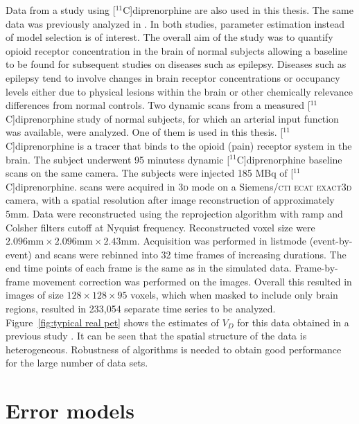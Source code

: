 Data from a \pet study using [$^{11}$C]diprenorphine are also used in this
thesis. The same data was previously analyzed in
\cite{Peng:2008fx,Jiang:2009kf}. In both studies, parameter estimation
instead of model selection is of interest. The overall aim of the study was
to quantify opioid receptor concentration in the brain of normal subjects
allowing a baseline to be found for subsequent studies on diseases such as
epilepsy. Diseases such as epilepsy tend to involve changes in brain receptor
concentrations or occupancy levels either due to physical lesions within the
brain or other chemically relevance differences from normal controls. Two
dynamic scans from a measured [$^{11}$C]diprenorphine study of normal
subjects, for which an arterial input function was available, were analyzed.
One of them is used in this thesis. [$^{11}$C]diprenorphine is a tracer that
binds to the opioid (pain) receptor system in the brain. The subject
underwent 95 minutess dynamic [$^{11}$C]diprenorphine \pet baseline scans on
the same camera. The subjects were injected 185 MBq of
[$^{11}$C]diprenorphine. \pet scans were acquired in \textsc{3d} mode on a
Siemens/\textsc{cti ecat exact3d} \pet camera, with a spatial resolution
after image reconstruction of approximately $5\text{mm}$. Data were
reconstructed using the reprojection algorithm \citep{Kinahan1989} with ramp
and Colsher filters cutoff at Nyquist frequency. Reconstructed voxel size
were $2.096 \text{mm} \times 2.096 \text{mm} \times2.43 \text{mm}$.
Acquisition was performed in listmode (event-by-event) and scans were
rebinned into 32 time frames of increasing durations. The end time points of
each frame is the same as in the simulated data. Frame-by-frame movement
correction was performed on the \pet images. Overall this resulted in images
of size $128\times128\times95$ voxels, which when masked to include only
brain regions, resulted in 233,054 separate time series to be analyzed.
Figure~\ref{fig:typical real pet} shows the estimates of $V_D$ for this data
obtained in a previous study \cite{Zhou2013}. It can be seen that the spatial
structure of the data is heterogeneous. Robustness of algorithms is needed to
obtain good performance for the large number of data sets.



\section{Error models}
\label{sec:Error models}

